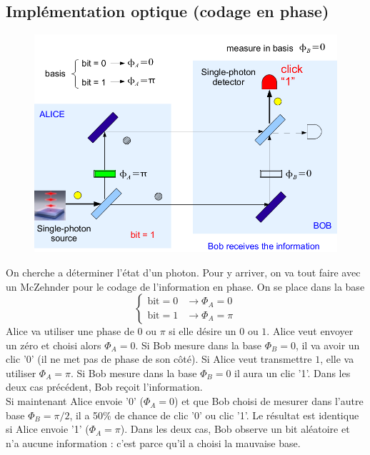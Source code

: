 \subsection{Implémentation optique (codage en phase)}
	\begin{figure}
	\vspace{-5mm}
	\includegraphics[scale=0.2]{ch3/image11}
	\end{figure}
On cherche a déterminer l'état d'un photon. Pour y arriver, on va tout faire avec un McZehnder pour
le codage de l'information en phase. On se place dans la base
\begin{equation}
\left\{\begin{array}{ll}
\text{bit} = 0 &\to \Phi_A=0\\
\text{bit} = 1 &\to \Phi_A=\pi
\end{array}\right.
\end{equation}
Alice va utiliser une phase de $0$ ou $\pi$ si elle désire un $0$ ou $1$. Alice veut envoyer un zéro
et choisi alors $\Phi_A=0$. Si Bob mesure dans la base $\Phi_B=0$, il va avoir un clic '0' (il ne met pas de phase de son côté). Si Alice veut transmettre $1$, elle va utiliser $\Phi_A=\pi$. Si Bob mesure
dans la base $\Phi_B=0$ il aura un clic '1'. Dans les deux cas précédent, Bob reçoit l'information.\\

Si maintenant Alice envoie '0' ($\Phi_A=0$) et que Bob choisi de mesurer dans l'autre base
$\Phi_B=\pi/2$, il a 50\% de chance de clic '0' ou clic '1'. Le résultat est identique si Alice 
envoie '1' ($\Phi_A=\pi$). Dans les deux cas, Bob observe un bit aléatoire et n'a aucune information :
c'est parce qu'il a choisi la mauvaise base. \\

